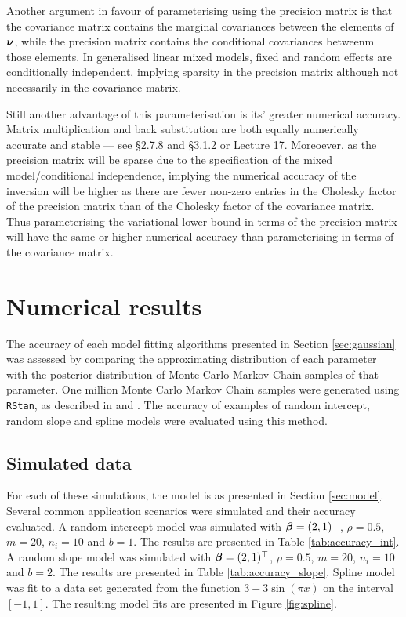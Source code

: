 Another argument in favour of parameterising using the precision matrix is that
the covariance matrix contains the marginal covariances between the elements of
${\boldsymbol \nu}$, while the precision matrix contains the conditional covariances
betweenm those elements. In generalised linear mixed models, fixed and random
effects are conditionally independent, implying sparsity in the precision
matrix although not necessarily in the covariance matrix.

Still another advantage of this parameterisation is its' greater numerical
accuracy.  Matrix multiplication and back substitution are both equally
numerically accurate and stable --- see \cite{Golub:1996:MC:248979} \S2.7.8 and
\S3.1.2 or \cite{trefethen97} Lecture 17. Moreoever, as the precision matrix
will be sparse due to the specification of the mixed model/conditional
independence, implying the numerical accuracy of the inversion will be higher
as there are fewer non-zero entries in the Cholesky factor of the precision
matrix than of the Cholesky factor of the covariance matrix. Thus
parameterising the variational lower bound in terms of the precision matrix
will have the same or higher numerical accuracy than parameterising in terms of
the covariance matrix.

\section{Numerical results}
\label{sec:results}
		
The accuracy of each model fitting algorithms presented in Section
\ref{sec:gaussian} was assessed by comparing the approximating distribution of
each parameter with the posterior distribution of Monte Carlo Markov Chain
samples of that parameter. One million Monte Carlo Markov Chain samples were
generated using \texttt{RStan}, as described in \cite{Carpenter2016} and
\cite{StanDevelopmentTeam2016}. The accuracy of examples of random intercept,
random slope and spline models were evaluated using this method.
		
\subsection{Simulated data}
		
For each of these simulations, the model is as presented in Section
\ref{sec:model}. Several common application scenarios were simulated and their
accuracy evaluated. A random intercept model was simulated with ${\boldsymbol \beta} = (2,
1)^\top$, $\rho = 0.5$, $m = 20$, $n_i = 10$ and $b = 1$. The results are
presented in Table \ref{tab:accuracy_int}. A random slope model was simulated
with ${\boldsymbol \beta} = (2, 1)^\top$, $\rho = 0.5$, $m = 20$, $n_i = 10$ and $b = 2$.
The results are presented in Table \ref{tab:accuracy_slope}. Spline model was
fit to a data set generated from the function $3 + 3 \sin{(\pi x)}$ on the
interval $[-1, 1]$. The resulting model fits are presented in Figure
\ref{fig:spline}.
		
